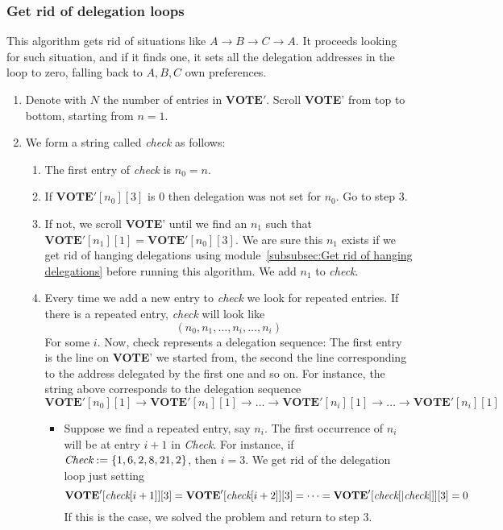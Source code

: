 \documentclass[submission, copyright,creativecommons,sharealike,noncommercial]{eptcs}
\newcommand{\Vote}{\textbf{VOTE}\xspace}
\begin{document}
\subsubsection{Get rid of delegation loops}\label{subsubsec:Get rid of delegation loops}
	This algorithm gets rid of situations like $A \to B \to C \to A$. It proceeds looking for such situation, and if it finds one, it sets all the delegation addresses in the loop to zero, falling back to $A,B,C$ own preferences.
	\begin{enumerate}
		\item Denote with $N$ the number of entries in $\Vote'$. Scroll \Vote' from top to bottom, starting from $n=1$.
		\item We form a string called \emph{check} as follows:
		\begin{enumerate}
			\item The first entry of \emph{check} is $n_0=n$.
			
			\item If $\Vote'[n_0][3]$ is $0$ then delegation was not set for $n_0$. Go to step $3$.

			\item If not, we scroll \Vote' until we find an $n_1$ such that $\Vote'[n_1][1] = \Vote'[n_0][3]$. We are sure this $n_1$ exists if we get rid of hanging delegations using module~\ref{subsubsec:Get rid of hanging delegations} before running this algorithm. We add $n_1$ to \emph{check}.
			
			\item Every time we add a new entry to \emph{check} we look for repeated entries. If there is a repeated entry, \emph{check} will look like
			\[
			(n_0,n_1,\dots, n_i, \dots, n_i)
			\]
			For some $i$. Now, check represents a delegation sequence: The first entry is the line on \Vote' we started from, the second the line corresponding to the address delegated by the first one and so on. For instance, the string above corresponds to the delegation sequence
			\[
			\Vote'[n_0][1] \to \Vote'[n_1][1] \to \dots \to \Vote'[n_i][1] \to \dots \to \Vote'[n_i][1]
			\]
			\begin{itemize}
				\item Suppose we find a repeated entry, say $n_i$. The first occurrence of $n_i$ will be at entry $i+1$ in \emph{Check}. For instance, if $\emph{Check}:=\{1,6,2,8,21,2\}$, then $i=3$. We get rid of the delegation loop just setting 
				\[
				\Vote'[\emph{check}[i+1]][3]=\Vote'[\emph{check}[i+2]][3] = \dots = \Vote'[\emph{check}[|\emph{check}|]][3]=0
				\]
				If this is the case, we solved the problem and return to step $3$.
			

\end{itemize}
\end{enumerate}
\end{enumerate}
\end{document}
